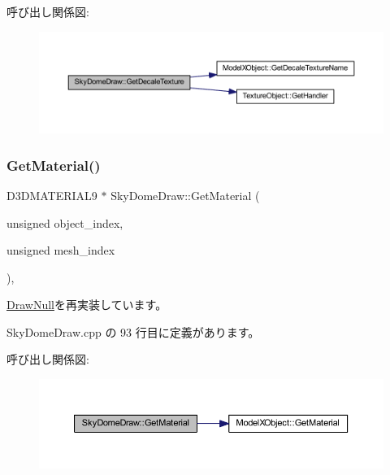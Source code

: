 呼び出し関係図\+:\nopagebreak
\begin{figure}[H]
\begin{center}
\leavevmode
\includegraphics[width=350pt]{class_sky_dome_draw_a1d708782f13648724e423d1dca22b213_cgraph}
\end{center}
\end{figure}
\mbox{\label{class_sky_dome_draw_acbc487d912b464474ae6f1afd7d6bb74}} 
\subsubsection{\texorpdfstring{Get\+Material()}{GetMaterial()}}
{\footnotesize\ttfamily D3\+D\+M\+A\+T\+E\+R\+I\+A\+L9 $\ast$ Sky\+Dome\+Draw\+::\+Get\+Material (\begin{DoxyParamCaption}\item[{unsigned}]{object\+\_\+index,  }\item[{unsigned}]{mesh\+\_\+index }\end{DoxyParamCaption})\hspace{0.3cm}{\ttfamily [override]}, {\ttfamily [virtual]}}



\mbox{\hyperlink{class_draw_null_a84969d22d3436986f214e9896fe44fc6}{Draw\+Null}}を再実装しています。



 Sky\+Dome\+Draw.\+cpp の 93 行目に定義があります。

呼び出し関係図\+:\nopagebreak
\begin{figure}[H]
\begin{center}
\leavevmode
\includegraphics[width=350pt]{class_sky_dome_draw_acbc487d912b464474ae6f1afd7d6bb74_cgraph}
\end{center}
\end{figure}
\mbox{\label{class_sky_dome_draw_ab947a3d43975a6d95149bc112c08ce05}} 
